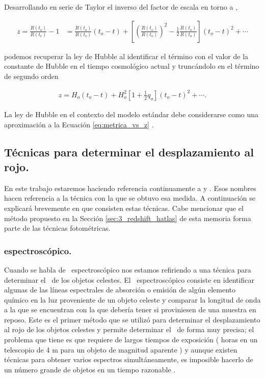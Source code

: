 Desarrollando en serie de Taylor el inverso del factor de escala en torno a ,

\begin{align}
    z =\frac{R(t_o)}{R(t_e)}-1 & = \frac{\dot{R}(t_o)}{R(t_o)}(t_o-t)+\left[ {\left(\frac{\dot{R}(t_o)}{R(t_o)}\right)}^{2}-\frac{1}{2}\frac{\ddot{R}(t_o)}{R(t_o)}\right]{(t_o-t)}^{2} +\cdots \nonumber
\end{align}

podemos recuperar la ley de Hubble al identificar el término  con el valor de la  constante de Hubble en el tiempo cosmológico actual  y truncándolo en el término de segundo orden

\vspace{-3mm}
 
\begin{align}
    z={H}_{o}(t_o-t)+{H}_{o}^{2}\left[1+\frac{1}{2} {q}_{o} \right]{(t_o-t)}^{2} +\cdots .\nonumber
\end{align}

La ley de Hubble en el contexto del modelo estándar debe considerarse como una aproximación a la Ecuación \ref{eq:metrica_vs_z} \citep{book:cosmologia}.

\subsection{Técnicas para determinar el desplazamiento al rojo.}

En este trabajo estaremos haciendo referencia continuamente a  y . Esos nombres hacen referencia a la técnica con la que se obtuvo esa medida. A continuación se explicará brevemente en que consisten estas técnicas. Cabe mencionar que el método propuesto en la Sección \ref{sec:3_redshift_hatlas} de esta memoria forma parte de las técnicas fotométricas.

\subsubsection{ espectroscópico.}

Cuando se habla de \rt\ espectroscópico nos estamos refiriendo a una técnica para determinar el \rt\ de los objetos celestes. El \rt\ espectroscópico consiste en identificar algunas de las líneas espectrales de absorción o emisión de algún elemento químico en la luz proveniente de un objeto celeste y comparar la longitud de onda a la que se encuentran con la que debería tener si proviniesen de una muestra en reposo. Este es el primer método que se utilizó para determinar el desplazamiento al rojo de los objetos celestes y permite determinar el \rt\ de forma muy precisa; el problema que tiene es que requiere de largos tiempos de exposición ( horas en un telescopio de 4 m para un objeto de magnitud aparente ) y aunque existen técnicas para obtener varios espectros simultáneamente, es imposible hacerlo de un número grande de objetos en un tiempo razonable \citep{tesis:robert_juncosa}.

